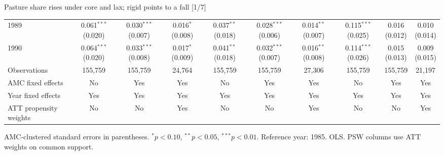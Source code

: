 \documentclass[aspectratio=169]{beamer}
\begin{document}
\begin{frame}{Pasture share rises under core and lax; rigid points to a fall [1/7]}
{\begin{tabular}{@{}l*{9}{c}@{}}
1989 & \shortstack{0.061$^{***}$\\(0.020)} & \shortstack{0.030$^{***}$\\(0.007)} & \shortstack{0.016$^{*}$\\(0.008)} & \shortstack{0.037$^{**}$\\(0.018)} & \shortstack{0.028$^{***}$\\(0.006)} & \shortstack{0.014$^{**}$\\(0.007)} & \shortstack{0.115$^{***}$\\(0.025)} & \shortstack{0.016\\(0.012)} & \shortstack{0.010\\(0.014)} \\
1990 & \shortstack{0.064$^{***}$\\(0.020)} & \shortstack{0.033$^{***}$\\(0.008)} & \shortstack{0.017$^{*}$\\(0.009)} & \shortstack{0.041$^{**}$\\(0.018)} & \shortstack{0.032$^{***}$\\(0.007)} & \shortstack{0.016$^{**}$\\(0.008)} & \shortstack{0.114$^{***}$\\(0.026)} & \shortstack{0.015\\(0.013)} & \shortstack{0.009\\(0.015)} \\
\midrule
Observations & 155,759 & 155,759 & 24,764 & 155,759 & 155,759 & 27,306 & 155,759 & 155,759 & 21,197 \\
AMC fixed effects & No & Yes & Yes & No & Yes & Yes & No & Yes & Yes \\
Year fixed effects & Yes & Yes & Yes & Yes & Yes & Yes & Yes & Yes & Yes \\
ATT propensity weights & No & No & Yes & No & No & Yes & No & No & Yes \\
\bottomrule
\end{tabular}%
}
\vspace{0.1em}
{\tiny\color{ZMidGray} AMC-clustered standard errors in parentheses. $^{*}p<0.10$, $^{**}p<0.05$, $^{***}p<0.01$. Reference year: 1985. OLS. PSW columns use ATT weights on common support.}
\end{frame}
\end{document}
